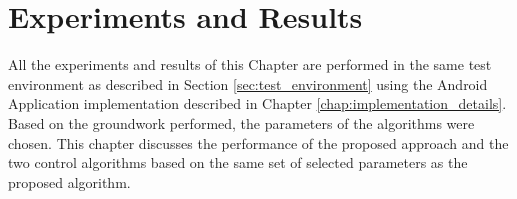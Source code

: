 \chapter{Experiments and Results\label{chap:results}}

All the experiments and results of this Chapter are performed in the 
same test environment as described in Section \ref{sec:test_environment} 
using the Android Application implementation described in Chapter 
\ref{chap:implementation_details}.
Based on the groundwork performed, the parameters of the algorithms were chosen.
This chapter discusses the performance of the proposed approach and the 
two control algorithms based on the same set of selected parameters as the 
proposed algorithm.









